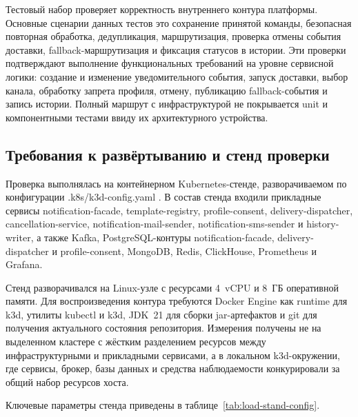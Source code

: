 Тестовый набор проверяет корректность внутреннего контура платформы. Основные сценарии данных тестов это сохранение принятой команды, безопасная повторная обработка, дедупликация, маршрутизация, проверка отмены события доставки, fallback-маршрутизация и фиксация статусов в истории. Эти проверки подтверждают выполнение функциональных требований на уровне сервисной логики: создание и изменение уведомительного события, запуск доставки, выбор канала, обработку запрета профиля, отмену, публикацию fallback-события и запись истории. Полный маршрут с инфраструктурой не покрывается unit и компонентными тестами ввиду их архитектурного устройства.

\subsection{Требования к развёртыванию и стенд проверки}

Проверка выполнялась на контейнерном Kubernetes-стенде, разворачиваемом по конфигурации .k8s/k3d-config.yaml \cite{kubernetes_in_action}. В состав стенда входили прикладные сервисы notification-facade, template-registry, profile-consent, delivery-dispatcher, cancellation-service, notification-mail-sender, notification-sms-sender и history-writer, а также Kafka, PostgreSQL-контуры notification-facade, delivery-dispatcher и profile-consent, MongoDB, Redis, ClickHouse, Prometheus и Grafana.

Стенд разворачивался на Linux-узле с ресурсами 4~vCPU и 8~ГБ оперативной памяти. Для воспроизведения контура требуются Docker Engine как runtime для k3d, утилиты kubectl и k3d, JDK~21 для сборки jar-артефактов и git для получения актуального состояния репозитория. Измерения получены не на выделенном кластере с жёстким разделением ресурсов между инфраструктурными и прикладными сервисами, а в локальном k3d-окружении, где сервисы, брокер, базы данных и средства наблюдаемости конкурировали за общий набор ресурсов хоста.

Ключевые параметры стенда приведены в таблице~\ref{tab:load-stand-config}.

